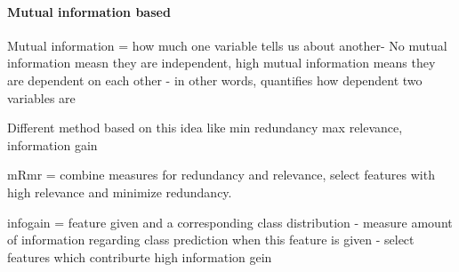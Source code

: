 \paragraph{Mutual information based}
\label{par:methods.flat.filter.mutual_information}

  
Mutual information  = how much one variable tells us about another- No mutual information measn they are independent, high mutual information means they are dependent on each other - in other words, quantifies how dependent two variables are

Different method based on this idea like min redundancy max relevance, information gain

mRmr = combine measures for redundancy and relevance, select features with high relevance and minimize redundancy.

infogain = feature given and a corresponding class distribution - measure amount of information regarding class prediction when this feature is given - select features which contriburte high information gein